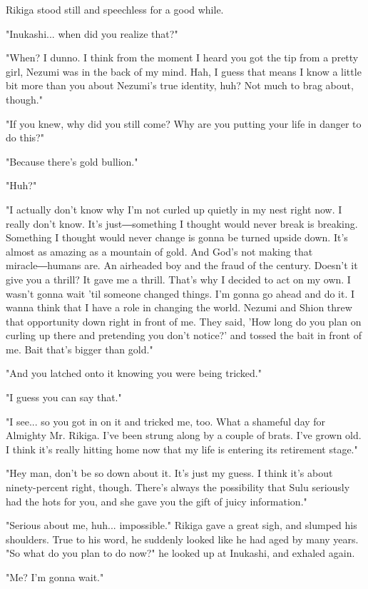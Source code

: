 Rikiga stood still and speechless for a good while.

"Inukashi... when did you realize that?"

"When? I dunno. I think from the moment I heard you got the tip from a
pretty girl, Nezumi was in the back of my mind. Hah, I guess that means
I know a little bit more than you about Nezumi's true identity, huh? Not
much to brag about, though."

"If you knew, why did you still come? Why are you putting your life in
danger to do this?"

"Because there's gold bullion."

"Huh?"

"I actually don't know why I'm not curled up quietly in my nest right
now. I really don't know. It's just―something I thought would never
break is breaking. Something I thought would never change is gonna be
turned upside down. It's almost as amazing as a mountain of gold. And
God's not making that miracle―humans are. An airheaded boy and the fraud
of the century. Doesn't it give you a thrill? It gave me a thrill.
That's why I decided to act on my own. I wasn't gonna wait 'til someone
changed things. I'm gonna go ahead and do it. I wanna think that I have
a role in changing the world. Nezumi and Shion threw that opportunity
down right in front of me. They said, 'How long do you plan on curling
up there and pretending you don't notice?' and tossed the bait in front
of me. Bait that's bigger than gold."

"And you latched onto it knowing you were being tricked."

"I guess you can say that."

"I see... so you got in on it and tricked me, too. What a shameful day
for Almighty Mr. Rikiga. I've been strung along by a couple of brats.
I've grown old. I think it's really hitting home now that my life is
entering its retirement stage."

"Hey man, don't be so down about it. It's just my guess. I think it's
about ninety-percent right, though. There's always the possibility that
Sulu seriously had the hots for you, and she gave you the gift of juicy
information."

"Serious about me, huh... impossible." Rikiga gave a great sigh, and
slumped his shoulders. True to his word, he suddenly looked like he had
aged by many years. "So what do you plan to do now?" he looked up at
Inukashi, and exhaled again.

"Me? I'm gonna wait."

